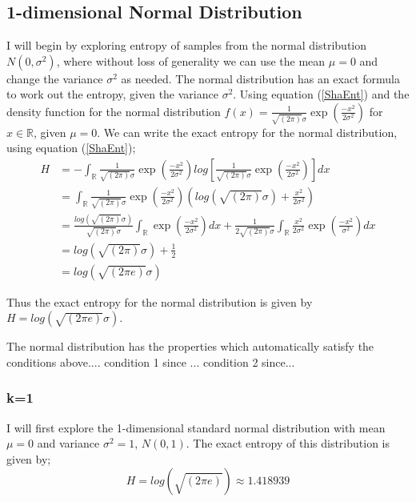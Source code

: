 \documentclass{article}
\begin{document}
\subsection{1-dimensional Normal Distribution}

I will begin by exploring entropy of samples from the normal distribution $N(0, \sigma^2)$, where without loss of generality we can use the mean $\mu = 0$ and change the variance $\sigma^2$ as needed. The normal distribution has an exact formula to work out the entropy, given the variance $\sigma^2$. Using equation (\ref{ShaEnt}) and the density function for the normal distribution $f(x) = \frac{1}{\sqrt{(2\pi)} \sigma}\exp{ \left( \frac{-x^2}{2\sigma^2} \right)}$ for $x \in \mathbb{R}$, given $\mu = 0$. We can write the exact entropy for the normal distribution, using equation (\ref{ShaEnt});
\begin{align}
H &= - \int_{\mathbb{R}} \frac{1}{\sqrt{(2\pi)} \sigma}\exp{ \left( \frac{-x^2}{2\sigma^2} \right)} log \left[\frac{1}{\sqrt{(2\pi)} \sigma}\exp{ \left( \frac{-x^2}{2\sigma^2} \right)} \right] dx \\
&=  \int_{\mathbb{R}} \frac{1}{\sqrt{(2\pi)} \sigma}\exp{ \left( \frac{-x^2}{2\sigma^2} \right)} \left( log(\sqrt{(2\pi)}\sigma) +  \frac{x^2}{2\sigma^2} \right) \\
&= \frac{log(\sqrt{(2\pi)}\sigma)}{\sqrt{(2\pi)} \sigma} \int_{\mathbb{R}} \exp{ \left( \frac{-x^2}{2\sigma^2} \right)} dx +  \frac{1}{2\sqrt{(2\pi)} \sigma} \int_{\mathbb{R}} \frac{x^2}{2\sigma^2}  \exp{ \left( \frac{-x^2}{\sigma^2} \right)} dx \\
&=  log(\sqrt{(2\pi)}\sigma) + \frac{1}{2} \\
&=  log(\sqrt{(2\pi e)}\sigma)
\end{align}

Thus the exact entropy for the normal distribution is given by $H =  log(\sqrt{(2\pi e)}\sigma)$. 

The normal distribution has the properties which automatically satisfy the conditions above.... condition 1 since ... condition 2 since...



\subsubsection{k=1}
I will first explore the 1-dimensional standard normal distribution with mean $\mu = 0$ and variance $\sigma^2 = 1$, $N(0, 1)$. The exact entropy of this distribution is given by;
\begin{equation}
H = log(\sqrt{(2\pi e)}) \approx 1.418939
\end{equation}
\end{document}
